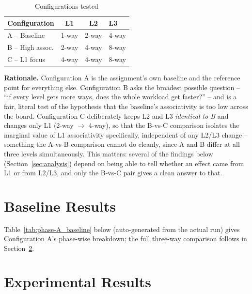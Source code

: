 \documentclass[11pt]{article}
\begin{document}
\begin{table}[H]
\centering
\begin{tabular}{lccl}
\toprule
Configuration & L1 & L2 & L3 \\
\midrule
A -- Baseline   & 1-way & 2-way & 4-way \\
B -- High assoc.& 2-way & 4-way & 8-way \\
C -- L1 focus   & 4-way & 4-way & 8-way \\
\bottomrule
\end{tabular}
\caption{Configurations tested}
\end{table}

\textbf{Rationale.} Configuration A is the assignment's own baseline and
the reference point for everything else. Configuration B asks the
broadest possible question -- ``if every level gets more ways, does the
whole workload get faster?'' -- and is a fair, literal test of the
hypothesis that the baseline's associativity is too low across the board.
Configuration C deliberately keeps L2 and L3 \emph{identical to B} and
changes only L1 (2-way $\to$ 4-way), so that the B-vs-C comparison isolates
the marginal value of L1 associativity specifically, independent of any
L2/L3 change -- something the A-vs-B comparison cannot do cleanly, since A
and B differ at all three levels simultaneously. This matters: several of
the findings below (Section~\ref{sec:analysis}) depend on being able to
tell whether an effect came from L1 or from L2/L3, and only the B-vs-C
pair gives a clean answer to that.

\section{Baseline Results}
\label{sec:results}

Table~\ref{tab:phase-A_baseline} below (auto-generated from the actual
run) gives Configuration A's phase-wise breakdown; the full three-way
comparison follows in Section~\ref{sec:comparison}.



\section{Experimental Results}
\label{sec:comparison}
\end{document}
